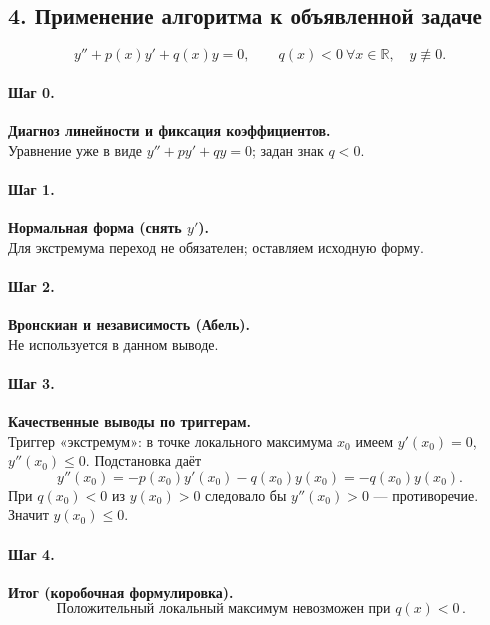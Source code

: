 \subsection*{4. Применение алгоритма к объявленной задаче}

\[
y''+p(x)y'+q(x)y=0,\qquad q(x)<0\ \forall x\in\mathbb R,\quad y\not\equiv0.
\]

\paragraph{Шаг 0.} \textbf{Диагноз линейности и фиксация коэффициентов.}\\
Уравнение уже в виде $y''+p y'+q y=0$; задан знак $q<0$.

\paragraph{Шаг 1.} \textbf{Нормальная форма (снять $y'$).}\\
Для экстремума переход не обязателен; оставляем исходную форму.

\paragraph{Шаг 2.} \textbf{Вронскиан и независимость (Абель).}\\
Не используется в данном выводе.

\paragraph{Шаг 3.} \textbf{Качественные выводы по триггерам.}\\
Триггер «экстремум»: в точке локального максимума $x_0$ имеем $y'(x_0)=0$, $y''(x_0)\le0$. Подстановка даёт
\[
y''(x_0)=-p(x_0)y'(x_0)-q(x_0)y(x_0)=-q(x_0)y(x_0).
\]
При $q(x_0)<0$ из $y(x_0)>0$ следовало бы $y''(x_0)>0$ — противоречие. Значит $y(x_0)\le0$.

\paragraph{Шаг 4.} \textbf{Итог (коробочная формулировка).}\\
\[
\boxed{\,\text{Положительный локальный максимум невозможен при } q(x)<0\, }.
\]